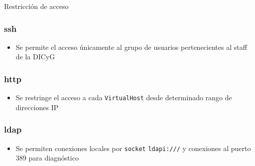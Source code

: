 Restricci\'{o}n de acceso

        \subsubsection {ssh}

\begin{itemize}
  \item Se permite el acceso \'{u}nicamente al grupo de usuarios pertenecientes al staff de la DICyG
\end{itemize}

        \subsubsection {http}

\begin{itemize}
  \item Se restringe el acceso a cada \texttt{VirtualHost} desde determinado rango de direcciones IP
\end{itemize}

        \subsubsection {ldap}

\begin{itemize}
  \item Se permiten conexiones locales por \texttt{socket} \texttt{ldapi:///} y conexiones al puerto 389 para diagn\'{o}stico
\end{itemize}

